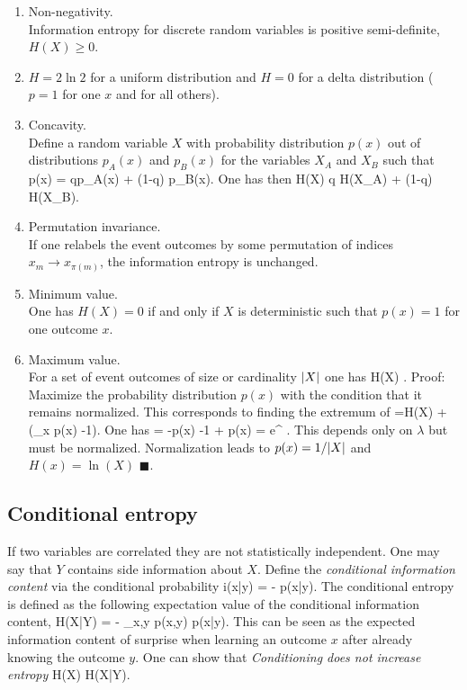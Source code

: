 \begin{enumerate}
	\item Non-negativity.\\
	Information entropy for discrete random variables is positive semi-definite, $H(X)\geq 0$.
	\item $H=2 \ln 2$ for a uniform distribution and $H=0$ for a delta distribution ($p=1$ for one $x$ and for all others).
	\item Concavity.\\
	Define a random variable $X$ with probability distribution $p(x)$ out of distributions $p_A(x)$ and $p_B(x)$ for the variables $X_A$ and $X_B$ such that
	\bse 
	p(x) = qp_A(x) + (1-q) p_B(x).
	\ese 
	One has then
	\be 
	H(X) \geq q H(X_A) + (1-q) H(X_B).
	\ee 
	\item Permutation invariance.\\
	If one relabels the event outcomes by some permutation of indices $x_m \rightarrow x_{\pi(m)}$, the information entropy is unchanged.
	\item Minimum value.\\
	One has $H(X)=0$ if and only if $X$ is deterministic such that $p(x)=1$ for one outcome $x$.
	\item Maximum value.\\
	For a set of event outcomes of size or cardinality $\abs{X}$ one has
	\be 
	H(X) \leq \ln {}.
	\ee 
	Proof:\\
	Maximize the probability distribution $p(x)$ with the condition that it remains normalized. This corresponds to finding the extremum of 
	\be 
	\label{eq:infoLagrangeMultiplier}
	\mL =H(X) + \lambda \left(\sum_x p(x) -1\right).
	\ee 
	One has 
	\bse 
	 = -\ln p(x) -1 + \; \Rightarrow \; p(x) = e^{ }.
	\ese 
	This depends only on $\lambda$ but must be normalized. Normalization leads to $p(x)= 1/\abs{X}$ and $H(x) = \ln(X)$    $\blacksquare$.
	
\end{enumerate}

\subsection{Conditional entropy}
\label{subsec:infoCondEntropy}
If two variables are correlated they are not statistically independent. One may say that $Y$ contains side information about $X$. Define the \emph{conditional information content} via the conditional probability
\be 
i(x|y) = - \ln p(x|y).
\ee 
The conditional entropy is defined as the following expectation value of the conditional information content,
\be 
\label{eq:infoCondEntropy}
H(X|Y) = - \sum_{x,y} p(x,y) \ln p(x|y).
\ee 
This can be seen as the expected information content of surprise when learning an outcome $x$ after already knowing the outcome $y$. One can show that \emph{Conditioning does not increase entropy}
\be
\label{eq:infoCondEntropyInequality}
H(X) \geq H(X|Y).
\ee 
